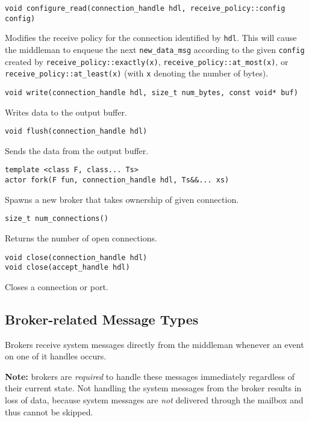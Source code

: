 \begin{lstlisting}
void configure_read(connection_handle hdl, receive_policy::config config)
\end{lstlisting}

Modifies the receive policy for the connection identified by \lstinline^hdl^. This will cause the middleman to enqueue the next \lstinline^new_data_msg^ according to the given \lstinline^config^ created by \lstinline^receive_policy::exactly(x)^, \lstinline^receive_policy::at_most(x)^, or \lstinline^receive_policy::at_least(x)^ (with \lstinline^x^ denoting the number of bytes).

\begin{lstlisting}
void write(connection_handle hdl, size_t num_bytes, const void* buf)
\end{lstlisting}

Writes data to the output buffer.

\begin{lstlisting}
void flush(connection_handle hdl)
\end{lstlisting}

Sends the data from the output buffer.

\clearpage
\begin{lstlisting}
template <class F, class... Ts>
actor fork(F fun, connection_handle hdl, Ts&&... xs)
\end{lstlisting}

Spawns a new broker that takes ownership of given connection.

\begin{lstlisting}
size_t num_connections()
\end{lstlisting}

Returns the number of open connections.

\begin{lstlisting}
void close(connection_handle hdl)
void close(accept_handle hdl)
\end{lstlisting}

Closes a connection or port.

\subsection{Broker-related Message Types}

Brokers receive system messages directly from the middleman whenever an event on one of it handles occurs.

\textbf{Note:} brokers are \emph{required} to handle these messages immediately regardless of their current state. Not handling the system messages from the broker results in loss of data, because system messages are \emph{not} delivered through the mailbox and thus cannot be skipped.

